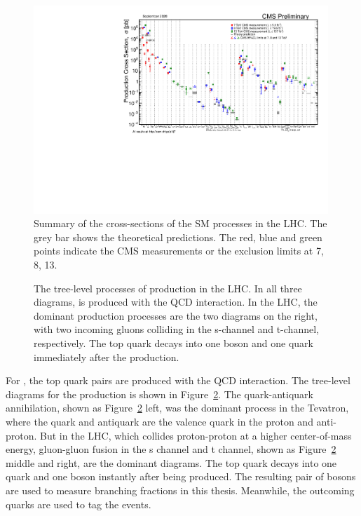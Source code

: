 \begin{figure}[ht]
    \centering
    \includegraphics[width=0.99\textwidth]{chapters/Physics/sectionPPCollision/figures/SigmaNew_v0.pdf}
    \caption{Summary of the cross-sections of the SM processes in the LHC. The grey bar shows the theoretical predictions. The red, blue and green points indicate the CMS measurements or the exclusion limits at 7, 8, 13\TeV.}
    \label{fig:physics:ppCollision:hardxs}
\end{figure}



\begin{figure}[ht]
    \centering
    
    \caption{The tree-level processes of \ttbar production in the LHC. In all three diagrams, \ttbar is produced with the QCD interaction. In the LHC, the dominant production processes are the two diagrams on the right, with two incoming gluons colliding in the s-channel and t-channel, respectively. The top quark decays into one \PW boson and one \PQb quark immediately after the production.}
    \label{fig:physics:ppCollision:tt}
\end{figure}
\noindent For \ttbar, the top quark pairs are produced with the QCD interaction. The tree-level diagrams for the \ttbar production is shown in Figure~\ref{fig:physics:ppCollision:tt}. The quark-antiquark annihilation, shown as Figure~\ref{fig:physics:ppCollision:tt} left, was the dominant process in the Tevatron, where the quark and antiquark are the valence quark in the proton and anti-proton. But in the LHC, which collides proton-proton at a higher center-of-mass energy, gluon-gluon fusion in the s channel and t channel, shown as  Figure~\ref{fig:physics:ppCollision:tt} middle and right, are the dominant diagrams. The top quark decays into one \PQb quark and one \PW boson instantly after being produced. The resulting pair of \PW bosons are used to measure \PW branching fractions in this thesis. Meanwhile, the outcoming \PQb quarks are used to tag the \ttbar events. 

